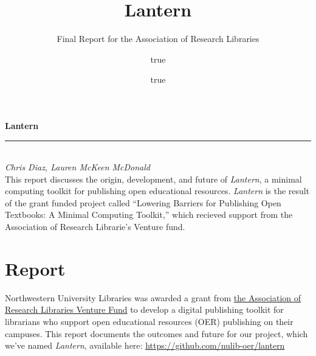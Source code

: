 \documentclass[
  11pt,
  openany]{book}
\title{Lantern}
\subtitle{Final Report for the Association of Research Libraries}
\author{true \and true}
\date{}
\begin{document}
\frontmatter

\begin{titlepage}
\begin{flushleft}

\textbf{\fontsize{48}{54}\selectfont Lantern \\}
{\color{gray}{\large Final Report for the Association of Research Libraries}}

\par\noindent\rule{1in}{2pt}\\


\textit{Chris Diaz, Lauren McKeen McDonald}\\

\vspace{1in}
This report discusses the origin, development, and future of \emph{Lantern}, a
minimal computing toolkit for publishing open educational resources.
\emph{Lantern} is the result of the grant funded project called ``Lowering
Barriers for Publishing Open Textbooks: A Minimal Computing Toolkit,'' which
recieved support from the Association of Research Librarie's Venture fund.

\end{flushleft}

  
\end{titlepage}
\restoregeometry





\mainmatter

\hypertarget{report}{%
\chapter{Report}\label{report}}

Northwestern University Libraries was awarded a grant from
\href{https://www.arl.org/news/arl-launches-venture-fund-to-support-research-and-development-in-member-libraries-proposals-due-february-28/}{the
Association of Research Libraries Venture Fund} to develop a digital
publishing toolkit for librarians who support open educational resources (OER)
publishing on their campuses. This report documents the outcomes and future
for our project, which we've named \emph{Lantern}, available here:
\url{https://github.com/nulib-oer/lantern}
\end{document}
